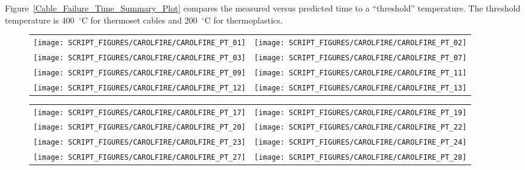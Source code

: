 Figure~\ref{Cable_Failure_Time_Summary_Plot} compares the measured versus predicted time to a ``threshold'' temperature. The threshold temperature is 400~$^\circ$C for thermoset cables and 200~$^\circ$C for thermoplastics.

\newpage

\begin{figure}[p]
\begin{tabular*}{\textwidth}{l@{\extracolsep{\fill}}r}
\texttt{[image: SCRIPT\_FIGURES/CAROLFIRE/CAROLFIRE\_PT\_01]} &
\texttt{[image: SCRIPT\_FIGURES/CAROLFIRE/CAROLFIRE\_PT\_02]} \\
\texttt{[image: SCRIPT\_FIGURES/CAROLFIRE/CAROLFIRE\_PT\_03]} &
\texttt{[image: SCRIPT\_FIGURES/CAROLFIRE/CAROLFIRE\_PT\_07]} \\
\texttt{[image: SCRIPT\_FIGURES/CAROLFIRE/CAROLFIRE\_PT\_09]} &
\texttt{[image: SCRIPT\_FIGURES/CAROLFIRE/CAROLFIRE\_PT\_11]} \\
\texttt{[image: SCRIPT\_FIGURES/CAROLFIRE/CAROLFIRE\_PT\_12]} &
\texttt{[image: SCRIPT\_FIGURES/CAROLFIRE/CAROLFIRE\_PT\_13]}
\end{tabular*}
\label{CAROLFIRE_Thermoset_1}
\end{figure}

\begin{figure}[p]
\begin{tabular*}{\textwidth}{l@{\extracolsep{\fill}}r}
\texttt{[image: SCRIPT\_FIGURES/CAROLFIRE/CAROLFIRE\_PT\_17]} &
\texttt{[image: SCRIPT\_FIGURES/CAROLFIRE/CAROLFIRE\_PT\_19]} \\
\texttt{[image: SCRIPT\_FIGURES/CAROLFIRE/CAROLFIRE\_PT\_20]} &
\texttt{[image: SCRIPT\_FIGURES/CAROLFIRE/CAROLFIRE\_PT\_22]} \\
\texttt{[image: SCRIPT\_FIGURES/CAROLFIRE/CAROLFIRE\_PT\_23]} &
\texttt{[image: SCRIPT\_FIGURES/CAROLFIRE/CAROLFIRE\_PT\_24]} \\
\texttt{[image: SCRIPT\_FIGURES/CAROLFIRE/CAROLFIRE\_PT\_27]} &
\texttt{[image: SCRIPT\_FIGURES/CAROLFIRE/CAROLFIRE\_PT\_28]}
\end{tabular*}
\label{CAROLFIRE_Thermoset_2}
\end{figure}

